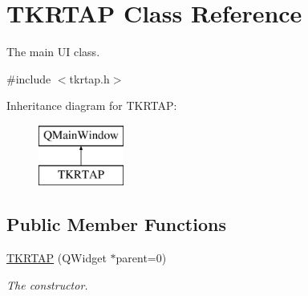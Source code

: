 \hypertarget{class_t_k_r_t_a_p}{\section{T\+K\+R\+T\+A\+P Class Reference}
\label{class_t_k_r_t_a_p}
}


The main U\+I class.  




{\ttfamily \#include $<$tkrtap.\+h$>$}

Inheritance diagram for T\+K\+R\+T\+A\+P\+:\begin{figure}[H]
\begin{center}
\leavevmode
\includegraphics[height=2.000000cm]{class_t_k_r_t_a_p}
\end{center}
\end{figure}
\subsection*{Public Member Functions}
\begin{DoxyCompactItemize}
\item 
\hyperlink{class_t_k_r_t_a_p_ae3eb36f7ee1ed36edc17ac850a6e415a}{T\+K\+R\+T\+A\+P} (Q\+Widget $\ast$parent=0)
\begin{DoxyCompactList}\small\item\em The constructor. \end{DoxyCompactList}\end{DoxyCompactItemize}
